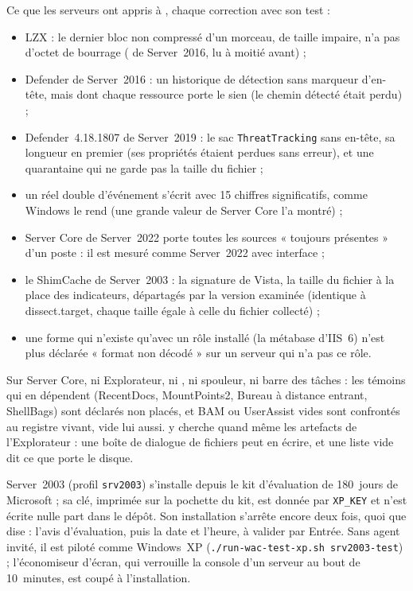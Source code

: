 \documentclass[11pt,a4paper,oneside]{report}
\begin{document}
Ce que les serveurs ont appris à \wac{}, chaque correction avec son test :
\begin{itemize}
  \item LZX : le dernier bloc non compressé d'un morceau, de taille impaire,
    n'a pas d'octet de bourrage ( de Server~2016, lu à
    moitié avant) ;
  \item Defender de Server~2016 : un historique de détection sans marqueur
    d'en-tête, mais dont chaque ressource porte le sien (le chemin détecté
    était perdu) ;
  \item Defender~4.18.1807 de Server~2019 : le sac \texttt{ThreatTracking}
    sans en-tête, sa longueur en premier (ses propriétés étaient perdues sans
    erreur), et une quarantaine qui ne garde pas la taille du fichier ;
  \item un réel double d'événement s'écrit avec 15 chiffres significatifs,
    comme Windows le rend (une grande valeur de Server Core l'a montré) ;
  \item Server Core de Server~2022 porte toutes les sources « toujours
    présentes » d'un poste : il est mesuré comme Server~2022 avec interface ;
  \item le ShimCache de Server~2003 : la signature de Vista, la taille du
    fichier à la place des indicateurs, départagés par la version examinée
    (identique à dissect.target, chaque taille égale à celle du fichier
    collecté) ;
  \item une forme qui n'existe qu'avec un rôle installé (la métabase
    d'IIS~6) n'est plus déclarée « format non décodé » sur un serveur qui
    n'a pas ce rôle.
\end{itemize}

Sur Server Core, ni Explorateur, ni , ni spouleur, ni
barre des tâches : les témoins qui en dépendent (RecentDocs, MountPoints2, Bureau
à distance entrant, ShellBags) sont déclarés non placés, et BAM ou UserAssist
vides sont confrontés au registre vivant, vide lui aussi. \wac{} y cherche
quand même les artefacts de l'Explorateur : une boîte de dialogue de fichiers
peut en écrire, et une liste vide dit ce que porte le disque.

Server~2003 (profil \texttt{srv2003}) s'installe depuis le kit d'évaluation de
180~jours de Microsoft ; sa clé, imprimée sur la pochette du kit, est donnée
par \texttt{XP\_KEY} et n'est écrite nulle part dans le dépôt. Son installation
s'arrête encore deux fois, quoi que dise  : l'avis
d'évaluation, puis la date et l'heure, à valider par Entrée. Sans agent
invité, il est piloté comme Windows~XP (\texttt{./run-wac-test-xp.sh
srv2003-test}) ; l'économiseur d'écran, qui verrouille la console d'un
serveur au bout de 10~minutes, est coupé à l'installation.
\end{document}
